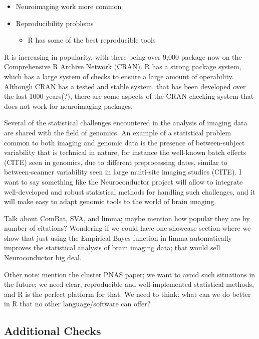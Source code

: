 \documentclass[]{elsarticle} %
\providecommand{\tightlist}{%
  \setlength{\itemsep}{0pt}\setlength{\parskip}{0pt}}
\newcommand{\fixme}[1]{{\color{red} #1}}
\newcommand{\fixme}[1]{{\color{red} #1}}
\begin{document}
\begin{itemize}
\tightlist
\item
  Neuroimaging work more common
\item
  Reproducibility problems

  \begin{itemize}
  \tightlist
  \item
    R has some of the best reproducible tools
  \end{itemize}
\end{itemize}

R is increasing in popularity, with there being over 9,000 package now
on the Comprehensive R Archive Network (CRAN). R has a strong package
system, which has a large system of checks to ensure a large amount of
operability. Although CRAN has a tested and stable system, that has been
developed over the last 1000 years(?), there are some aspects of the
CRAN checking system that does not work for neuroimaging packages.

\fixme{Several of the statistical challenges encountered in the analysis of imaging data are shared with the field of genomics. An example of a statistical problem common to both imaging and genomic data is the presence of between-subject variability that is technical in nature, for instance the well-known batch effects (CITE) seen in genomics, due to different preprocessing dates, similar to between-scanner variability seen in large multi-site imaging studies (CITE). I want to say something like the Neuroconductor project will allow to integrate well-developed and robust statistical methods for handling such challenges, and it will make easy to adapt genomic tools to the world of brain imaging.

Talk about ComBat, SVA, and limma; maybe mention how popular they are by number of citations? Wondering if we could have one showcase section where we show that just using the Empirical Bayes function in limma automatically improves the statistical analysis of brain imaging data; that would sell Neuroconductor big deal. }


\fixme{Other note: mention the cluster PNAS paper; we want to avoid such situations in the future; we need clear, reproducible and well-implemented statistical methods, and R is the perfect platform for that. We need to think: what can we do better in R that no other language/software can offer?}


\subsection{Additional Checks}\label{additional-checks}
\end{document}
